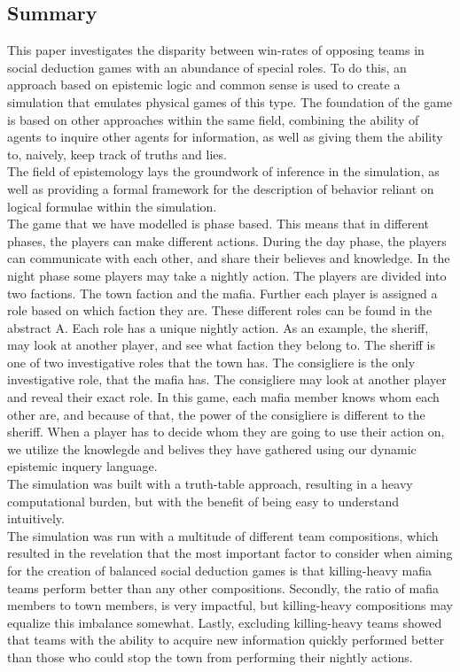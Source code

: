 \onecolumn
\begin{center}
	\section*{Summary}\label{sec:summary}
\end{center}
This paper investigates the disparity between win-rates of opposing teams in 
social deduction games with an abundance of special roles. To do  this, an 
approach based on epistemic logic and common sense is used to create a 
simulation that emulates physical games of this type. The foundation of the 
game is based on other approaches within the same field, combining the ability 
of agents to inquire other agents for information, as well as giving them the 
ability to, naively, keep track of truths and lies. \\
The field of epistemology lays the groundwork of inference in the simulation, 
as well as providing a formal framework for the description of behavior 
reliant on logical formulae within the simulation. \\
The game that we have modelled is phase based. This means that in different phases, the players can make different actions. During the day phase, the players can communicate with each other, and share their believes and knowledge. In the night phase some players may take a nightly action. The players are divided into two factions. The town faction and the mafia. Further each player is assigned a role based on which faction they are. These different roles can be found in the abstract A. Each role has a unique nightly action. As an example, the sheriff, may look at another player, and see what faction they belong to. The sheriff is one of two investigative roles that the town has. The consigliere is the only investigative role, that the mafia has. The consigliere may look at another player and reveal their exact role. In this game, each mafia member knows whom each other are, and because of that, the power of the consigliere is different to the sheriff.
When a player has to decide whom they are going to use their action on, we utilize the knowlegde and belives they have gathered using our dynamic epistemic inquery language. \\
The simulation was built with a truth-table approach, resulting in a heavy 
computational burden, but with the benefit of being easy to understand 
intuitively. \\
The simulation was run with a multitude of different team compositions, which 
resulted in the revelation that the most important factor to consider when 
aiming for the creation of balanced social deduction games is that killing-heavy mafia teams perform better than any other compositions. Secondly, the ratio of mafia members to town members, is very impactful, but killing-heavy compositions may equalize this imbalance somewhat. Lastly, excluding killing-heavy teams showed that teams with the ability to acquire new information quickly performed better than those who could stop the town from performing their nightly actions. 
\twocolumn